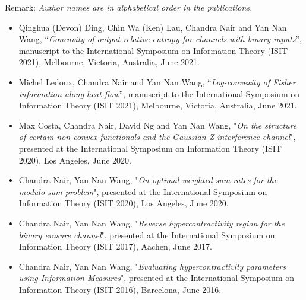\documentclass[8pt,a4paper,ragged2e,withhyper]{altacv}
\begin{document}
Remark: \textit{Author names are in alphabetical order in the publications.}
\begin{itemize}
\item Qinghua (Devon) Ding, Chin Wa (Ken) Lau, Chandra Nair and Yan Nan Wang, ``\textit{Concavity of output relative entropy for channels with binary inputs}'', manuscript to the International Symposium on Information Theory (ISIT 2021), Melbourne, Victoria, Australia, June 2021.
\item Michel Ledoux, Chandra Nair and Yan Nan Wang, ``\textit{Log-convexity of Fisher information along heat flow}'', manuscript to the International Symposium on Information Theory (ISIT 2021), Melbourne, Victoria, Australia, June 2021.
\item Max Costa, Chandra Nair, David Ng and Yan Nan Wang, "\textit{On the structure of certain non-convex functionals and the Gaussian Z-interference channel}", presented at the International Symposium on Information Theory (ISIT 2020), Los Angeles, June 2020.
\item Chandra Nair, Yan Nan Wang, "\textit{On optimal weighted-sum rates for the modulo sum problem}", presented at the International Symposium on Information Theory (ISIT 2020), Los Angeles, June 2020.
\item Chandra Nair, Yan Nan Wang, "\textit{Reverse hypercontractivity region for the binary erasure channel}", presented at the International Symposium on Information Theory (ISIT 2017), Aachen, June 2017.
\item Chandra Nair, Yan Nan Wang, "\textit{Evaluating hypercontractivity parameters using Information Measures}", presented at the International Symposium on Information Theory (ISIT 2016), Barcelona, June 2016.
\end{itemize}
\end{document}
